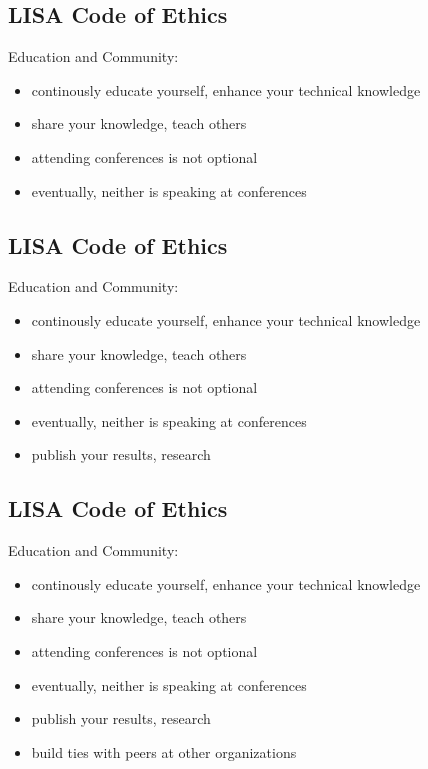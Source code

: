 \documentclass[xga]{xdvislides}
\begin{document}
\subsection{LISA Code of Ethics}
Education and Community:
\begin{itemize}
	\item continously educate yourself, enhance your technical knowledge
	\item share your knowledge, teach others
	\item attending conferences is not optional
	\item eventually, neither is speaking at conferences
\end{itemize}

\subsection{LISA Code of Ethics}
Education and Community:
\begin{itemize}
	\item continously educate yourself, enhance your technical knowledge
	\item share your knowledge, teach others
	\item attending conferences is not optional
	\item eventually, neither is speaking at conferences
	\item publish your results, research
\end{itemize}

\subsection{LISA Code of Ethics}
Education and Community:
\begin{itemize}
	\item continously educate yourself, enhance your technical knowledge
	\item share your knowledge, teach others
	\item attending conferences is not optional
	\item eventually, neither is speaking at conferences
	\item publish your results, research
	\item build ties with peers at other organizations
\end{itemize}
\end{document}
